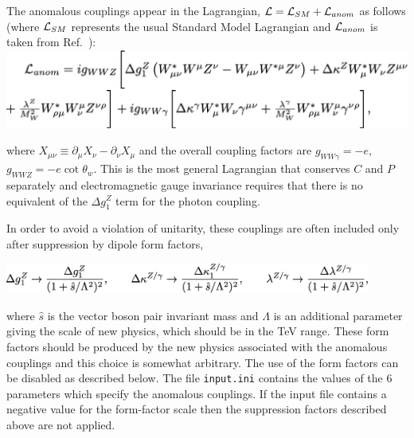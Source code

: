 The anomalous couplings appear in the Lagrangian,
${\cal L} = {\cal L}_{SM} + {\cal L}_{anom}$ as follows
(where ${\cal L}_{SM}$ represents the usual Standard Model Lagrangian and
${\cal L}_{anom}$ is taken from Ref.~\cite{Dixon:1999di}):
\includegraphics[width=\textwidth]{./sections/gobbets/Lagrangian.png}

where $X_{\mu\nu} \equiv \partial_\mu X_{\nu} - \partial_\nu X_{\mu}$
and the overall coupling factors are $g_{WW\gamma}=-e$,
$g_{WWZ}=-e\cot\theta_w$.
This is the most general Lagrangian that conserves $C$ and $P$
separately and electromagnetic gauge invariance requires that there
is no equivalent of the $\Delta g_1^Z$ term for the photon coupling.

In order to avoid a violation of unitarity, these couplings are often
included only after suppression by dipole form factors,

\includegraphics[width=0.9\textwidth]{./sections/gobbets/Dipole.png}

where $\hat{s}$ is the vector boson pair invariant mass and $\Lambda$
is an additional parameter giving the scale of new physics, which should
be in the TeV range.
These form factors should be produced by the new physics associated
with the anomalous couplings and this choice is somewhat
arbitrary. The use of the form factors can be disabled as described
below.  The file {\tt input.ini} contains the values of the $6$
parameters which specify the anomalous couplings.  If the input file
contains a negative value for the form-factor scale then the
suppression factors described above are not applied.

